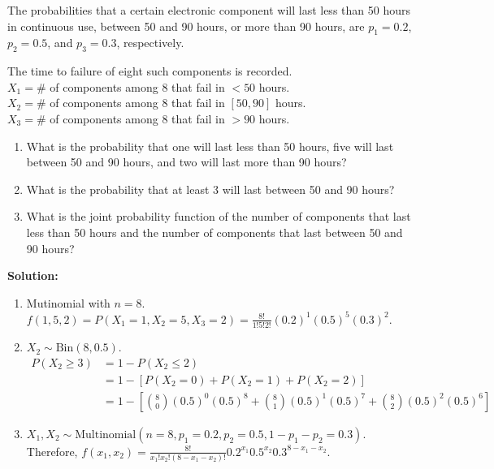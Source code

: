 \pagebreak

\begin{example}
    The probabilities that a certain electronic component will last less than 50 hours in continuous use, between 50 and 90 hours, or more than 90 hours, are $p_1 = 0.2$, $p_2 = 0.5$, and $p_3 = 0.3$, respectively.

    The time to failure of eight such components is recorded. \\
    $X_1 = \#$ of components among 8 that fail in $< 50$ hours. \\
    $X_2 = \#$ of components among 8 that fail in $[50,90]$ hours. \\
    $X_3 = \#$ of components among 8 that fail in $> 90$ hours.
    \begin{enumerate}[label=(\alph*)]
        \item What is the probability that one will last less than 50 hours, five will last between 50 and 90 hours, and two will last more than 90 hours?
        \item What is the probability that at least 3 will last between 50 and 90 hours?
        \item What is the joint probability function of the number of components that last less than 50 hours and the number of components that last between 50 and 90 hours?
    \end{enumerate}

    \textbf{Solution:}
    \begin{enumerate}[label=(\alph*)]
        \item Mutinomial with $n=8$. $f(1,5,2) = P(X_1 = 1, X_2 = 5, X_3 = 2) = \frac{8!}{1!5!2!}(0.2)^1 (0.5)^5 (0.3)^2$.
        \item $X_2 \sim \text{Bin}(8,0.5)$. \vspace{-3mm}
        \begin{align*}
            P(X_2 \geq 3) &= 1 - P(X_2 \leq 2) \\
            &= 1 - \left[ P(X_2 = 0) + P(X_2 = 1) + P(X_2 = 2) \right] \\
            &= 1 - \left[ \binom{8}{0} (0.5)^0 (0.5)^8 + \binom{8}{1} (0.5)^1 (0.5)^7 + \binom{8}{2} (0.5)^2 (0.5)^6 \right]
        \end{align*}
        \item $X_1,X_2 \sim \text{Multinomial}(n=8,p_1=0.2,p_2=0.5,1-p_1 -p_2 = 0.3)$. \\
        Therefore, $f(x_1,x_2) = \frac{8!}{x_1! x_2! (8-x_1 - x_2)!}0.2^{x_1}0.5^{x_2} 0.3^{8-x_1-x_2}$. \\
    \end{enumerate}
\end{example}


